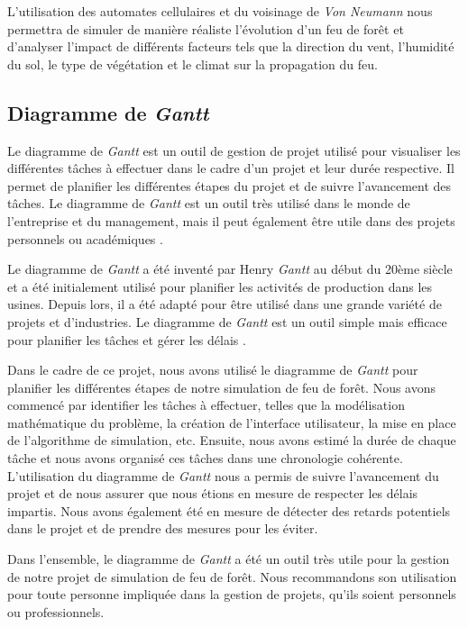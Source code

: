 L'utilisation des automates cellulaires et du voisinage de \textit{Von Neumann} nous permettra de simuler de manière réaliste l'évolution d'un feu de forêt et d'analyser l'impact de différents facteurs tels que la direction du vent, l'humidité du sol, le type de végétation et le climat sur la propagation du feu.

\subsection{Diagramme de \textit{Gantt}}

Le diagramme de \textit{Gantt} est un outil de gestion de projet utilisé pour visualiser les différentes tâches à effectuer dans le cadre d'un projet et leur durée respective. Il permet de planifier les différentes étapes du projet et de suivre l'avancement des tâches. Le diagramme de \textit{Gantt} est un outil très utilisé dans le monde de l'entreprise et du management, mais il peut également être utile dans des projets personnels ou académiques \parencite{gantt1916work}.

Le diagramme de \textit{Gantt} a été inventé par Henry \textit{Gantt} au début du 20ème siècle et a été initialement utilisé pour planifier les activités de production dans les usines. Depuis lors, il a été adapté pour être utilisé dans une grande variété de projets et d'industries. Le diagramme de \textit{Gantt} est un outil simple mais efficace pour planifier les tâches et gérer les délais \parencite{lesikar2003basic}.

Dans le cadre de ce projet, nous avons utilisé le diagramme de \textit{Gantt} pour planifier les différentes étapes de notre simulation de feu de forêt. Nous avons commencé par identifier les tâches à effectuer, telles que la modélisation mathématique du problème, la création de l'interface utilisateur, la mise en place de l'algorithme de simulation, etc. Ensuite, nous avons estimé la durée de chaque tâche et nous avons organisé ces tâches dans une chronologie cohérente.
L'utilisation du diagramme de \textit{Gantt} nous a permis de suivre l'avancement du projet et de nous assurer que nous étions en mesure de respecter les délais impartis. Nous avons également été en mesure de détecter des retards potentiels dans le projet et de prendre des mesures pour les éviter.

Dans l'ensemble, le diagramme de \textit{Gantt} a été un outil très utile pour la gestion de notre projet de simulation de feu de forêt. Nous recommandons son utilisation pour toute personne impliquée dans la gestion de projets, qu'ils soient personnels ou professionnels.

